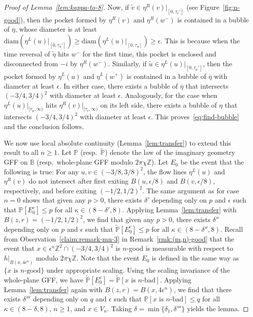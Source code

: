 \documentclass[a4paper]{article}
\numberwithin{equation}{section}
\numberwithin{equation}{section}
\renewcommand{\1}{\mathbf{1}}
\begin{document}
\begin{proof}[Proof of Lemma~\ref{lem:kappa-to-8}]
    Now, if $\widetilde v \in \eta^R(v)|_{[0,\tau_v']}$ (see Figure~\ref{fig:n-good}), then the pocket formed by $\eta^R(v)$ and $\eta^R(w^-)$ is contained in a bubble of $\overline \eta$, whose diameter is at least $\mathrm{diam}(\eta^L(u)|_{[0,\tau_u']}) \ge \mathrm{diam}(\eta^L(u)|_{[0,\tau_u]}) \ge \epsilon$. This is because when the time reversal of $\widetilde \eta$ hits $w^-$ for the first time, this pocket is enclosed and disconnected from $-i$ by $\eta^R(w^-)$. Similarly, if $\widetilde u \in \eta^L(u)|_{[0,\tau_u']}$, then the pocket formed by $\eta^L(u)$ and $\eta^L(w^+)$ is contained in a bubble of $\overline\eta$ with diameter at least $\epsilon$. In either case, there exists a bubble of $\overline\eta$ that intersects $(-3/4,3/4)^2$ with diameter at least $\epsilon$. Analogously, for the case when $\eta^L(u)|_{[\tau_u,\infty)}$ hits $\eta^R(v)|_{[\tau_v,\infty)}$ on its left side, there exists a bubble of $\eta$ that intersects $(-3/4,3/4)^2$ with diameter at least $\epsilon$. This proves~\eqref{eq:find-bubble} and the conclusion follows.

    We now use local absolute continuity (Lemma~\ref{lem:transfer}) to extend this result to all $n \ge 1$. Let $\mathbb{P}$ (resp.\ $\widetilde{\mathbb{P}}$) denote the law of the imaginary geometry GFF on $\mathbb B$ (resp.\ whole-plane GFF modulo $2\pi\chi \mathbb Z$). Let $E_0$ be the event that the following is true: For any $u,v \in (-3/8,3/8)^2$, the flow lines $\eta^L(u)$ and $\eta^R(v)$ do not intersect after first exiting $B(u,\epsilon/8)$ and $B(v,\epsilon/8)$, respectively, and before exiting $(-1/2,1/2)^2$. The same argument as for case $n=0$ shows that given any $p>0$, there exists $\delta'$ depending only on $p$ and $\epsilon$ such that $\mathbb P[E_0^c] \le p$ for all $\kappa \in (8-\delta',8)$.
    Applying Lemma~\ref{lem:transfer} with $B(z,r) = (-1/2,1/2)^2$, we find that given any $p>0$, there exists $\delta''$ depending only on $p$ and $\epsilon$ such that $\widetilde{\mathbb P}[E_0^c] \le p$ for all $\kappa \in (8-\delta'',8)$. Recall from Observation~\eqref{claim:remark-mn-3} in Remark~\ref{rmk:(m,n)-good} that the event that $x \in \epsilon^n \mathbb Z^2 \cap (-3/4,3/4)^2$ is $n$-good is measurable with respect to $h|_{B(x,4\epsilon^n)}$ modulo $2\pi\chi \mathbb Z$. Note that the event $E_0$ is defined in the same way as $\{ x \mbox{ is } n \mbox{-good} \}$ under appropriate scaling. Using the scaling invariance of the whole-plane GFF, we have $\widetilde{\mathbb P}[E_0^c] = \widetilde{\mathbb P}[x \mbox{ is } n \mbox{-bad}]$. Applying Lemma~\ref{lem:transfer} again with $B(z,r) = B(x, 4\epsilon^n)$, we find that there exists $\delta'''$ depending only on $q$ and $\epsilon$ such that $\mathbb P[x \mbox{ is } n \mbox{-bad}] \le q$ for all $\kappa \in (8-\delta,8)$, $n \geq 1$, and $x \in V_n$. Taking $\delta = \min \{ \delta_1, \delta''' \}$ yields the lemma.
\end{proof}
\end{document}

